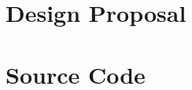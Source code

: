\documentclass[11pt]{mvlthesis}
\begin{document}




%



%
\appendix 


\chapter{Design Proposal}
\label{ch:proposal}





\chapter{Source Code}
\label{ch:code}


\end{document}
